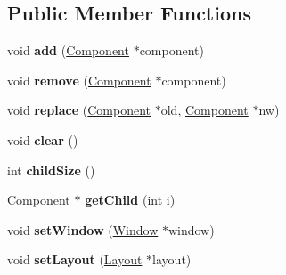 \subsection*{Public Member Functions}
\begin{DoxyCompactItemize}
\item 
\hypertarget{classgraphics_1_1_container_a787976189730beaa460e232c11995d2b}{void {\bfseries add} (\hyperlink{classgraphics_1_1_component}{Component} $\ast$component)}\label{classgraphics_1_1_container_a787976189730beaa460e232c11995d2b}

\item 
\hypertarget{classgraphics_1_1_container_a72ed2c7dfa03aa16997283bcf4c3f0c8}{void {\bfseries remove} (\hyperlink{classgraphics_1_1_component}{Component} $\ast$component)}\label{classgraphics_1_1_container_a72ed2c7dfa03aa16997283bcf4c3f0c8}

\item 
\hypertarget{classgraphics_1_1_container_a59857c605694a21e55f7d07ce27148f6}{void {\bfseries replace} (\hyperlink{classgraphics_1_1_component}{Component} $\ast$old, \hyperlink{classgraphics_1_1_component}{Component} $\ast$nw)}\label{classgraphics_1_1_container_a59857c605694a21e55f7d07ce27148f6}

\item 
\hypertarget{classgraphics_1_1_container_a034240c27ee51b024ac7c5b210804f44}{void {\bfseries clear} ()}\label{classgraphics_1_1_container_a034240c27ee51b024ac7c5b210804f44}

\item 
\hypertarget{classgraphics_1_1_container_ac19e3cac7a6c42a450fc63adeaeb54fb}{int {\bfseries child\-Size} ()}\label{classgraphics_1_1_container_ac19e3cac7a6c42a450fc63adeaeb54fb}

\item 
\hypertarget{classgraphics_1_1_container_aa7bdd5a0e0f7920bea1dce2bb9d0eba0}{\hyperlink{classgraphics_1_1_component}{Component} $\ast$ {\bfseries get\-Child} (int i)}\label{classgraphics_1_1_container_aa7bdd5a0e0f7920bea1dce2bb9d0eba0}

\item 
\hypertarget{classgraphics_1_1_container_af85f5ff442046cd1e53cde7d6bbd9941}{void {\bfseries set\-Window} (\hyperlink{classgraphics_1_1_window}{Window} $\ast$window)}\label{classgraphics_1_1_container_af85f5ff442046cd1e53cde7d6bbd9941}

\item 
\hypertarget{classgraphics_1_1_container_a1f7d5668e44554603e702943ec7501bf}{void {\bfseries set\-Layout} (\hyperlink{classgraphics_1_1_layout}{Layout} $\ast$layout)}\label{classgraphics_1_1_container_a1f7d5668e44554603e702943ec7501bf}


\end{DoxyCompactItemize}
